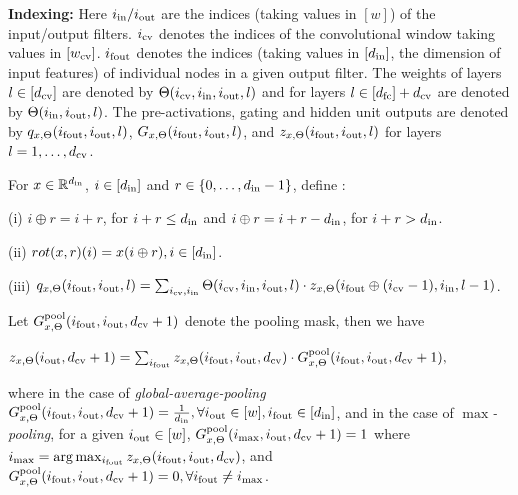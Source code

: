 \textbf{Indexing:} Here $i_{\text{in}}/i_{\text{out}}$ are the indices (taking values in $[w]$) of the input/output filters. $i_{\text{cv}}$ denotes the indices of the convolutional window taking values in $[w_{\text{cv}}]$. $i_{\text{fout}}$ denotes the indices (taking values in $[d_{\text{in}}]$, the dimension of input features) of individual nodes in a given output filter. The weights of layers $l\in[d_{\text{cv}}]$ are denoted by $\Theta(i_{\text{cv}},i_{\text{in}},i_{\text{out}},l)$ and for layers $l\in[d_{\text{fc}}]+d_{\text{cv}}$ are denoted by $\Theta(i_{\text{in}},i_{\text{out}},l)$. The pre-activations, gating and hidden unit outputs are denoted by $q_{x,\Theta}(i_{\text{fout}},i_{\text{out}},l)$,  $G_{x,\Theta}(i_{\text{fout}},i_{\text{out}},l)$, and $z_{x,\Theta}(i_{\text{fout}},i_{\text{out}},l)$ for layers $l=1,\ldots, d_{\text{cv}}$.


\begin{definition}
For $x\in\mathbb{R}^{d_{\text{in}}}$, $i\in[d_{\text{in}}]$ and $r\in\{0,\ldots,d_{\text{in}}-1\}$, define :

(i) $i\oplus r = i+r$, for $i+r \leq d_{\text{in}}$ and $i\oplus r =i+r-d_{\text{in}}$, for $i+r>d_{\text{in}}$.

(ii) $rot(x,r)(i)=x(i\oplus r), i\in[d_{\text{in}}]$.

(iii) $q_{x,\Theta}(i_{\text{fout}},i_{\text{out}},l)=\sum_{i_{\text{cv}},i_{\text{in}}}\Theta(i_{\text{cv}},i_{\text{in}},i_{\text{out}},l)\cdot z_{x,\Theta}(i_{\text{fout}}\oplus (i_{\text{cv}}-1),i_{\text{in}},l-1)$. 
\end{definition}
\begin{definition}[Pooling]\label{def:pooling}
Let $G^{\text{pool}}_{x,\Theta}(i_{\text{fout}},i_{\text{out}},d_{\text{cv}}+1)$ denote the pooling mask, then we have
\centerline{
$z_{x,\Theta}(i_{\text{out}}, d_{\text{cv}}+1) =\sum_{i_{\text{fout}}} z_{x,\Theta}(i_{\text{fout}},i_{\text{out}},d_{\text{cv}})\cdot G^{\text{pool}}_{x,\Theta}(i_{\text{fout}},i_{\text{out}},d_{\text{cv}}+1),$
}
where in the case of \emph{global-average-pooling} $G^{\text{pool}}_{x,\Theta}(i_{\text{fout}},i_{\text{out}},d_{\text{cv}}+1)=\frac{1}{d_{\text{in}}},\forall i_{\text{out}}\in[w], i_{\text{fout}}\in[d_{\text{in}}]$, and in the case of \emph{$\max$-pooling},  
for a given $i_{\text{out}}\in[w]$, $G^{\text{pool}}_{x,\Theta}(i_{\max},i_{\text{out}},d_{\text{cv}}+1)=1$ where $i_{\max}=\arg\max_{i_{\text{fout}}}z_{x,\Theta}(i_{\text{fout}},i_{\text{out}},d_{\text{cv}})$, and $G^{\text{pool}}_{x,\Theta}(i_{\text{fout}},i_{\text{out}},d_{\text{cv}}+1)=0,\forall i_{\text{fout}}\neq i_{\max}$.
\end{definition}

